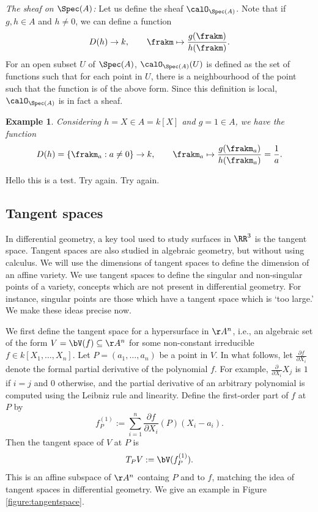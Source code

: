\documentclass[12pt]{amsart}
\theoremstyle{plain}
\newtheorem{example}[theorem]{Example}
\begin{document}
\emph{The sheaf on $\Spec(A)$:}
Let us define the sheaf $\calO_{\Spec(A)}$.
Note that if $g, h\in A$ and $h \ne 0$, we can define a function
$$D(h) \to k, \qquad \frakm \mapsto \frac{g(\frakm)}{h(\frakm)}.$$
For an open subset $U$ of $\Spec(A)$, $\calO_{\Spec(A)}(U)$ is defined as the set of functions such that for each point in $U$, there is a neighbourhood of the point such that the function is of the above form.
Since this definition is local, $\calO_{\Spec(A)}$ is in fact a sheaf.

\begin{example}
Considering $h = X \in A=k[X]$ and $g=1\in A$, we have the function 
$$D(h) =\{\frakm_a : a \ne 0\} \to k, \qquad \frakm_a \mapsto \frac{g(\frakm_a)}{h(\frakm_a)} = \frac{1}{a}.$$
\end{example}

Hello this is a test. Try again. Try again.

\subsection{Tangent spaces}
In differential geometry, a key tool used to study surfaces in $\RR^3$ is the tangent space.
Tangent spaces are also studied in algebraic geometry, but without using calculus.
We will use the dimensions of tangent spaces to define the dimension of an affine variety.
We use tangent spaces to define the singular and non-singular points of a variety, concepts which are not present in differential geometry.
For instance, singular points are those which have a tangent space which is `too large.'
We make these ideas precise now.

We first define the tangent space for a hypersurface in $\AA^n$, i.e., an algebraic set of the form $V=\bV(f)\subseteq \AA^n$ for some non-constant irreducible $f \in k[X_1,\ldots,X_n]$.
Let $P=(a_1,\ldots,a_n)$ be a point in $V$.
In what follows, let $\frac{\partial f}{\partial X_i}$ denote the formal partial derivative of the polynomial $f$.
For example, $\frac{\partial}{\partial X_i} X_j$ is $1$ if $i=j$ and $0$ otherwise, and the partial derivative of an arbitrary polynomial is computed using the Leibniz rule and linearity.
Define the first-order part of $f$ at $P$ by
\begin{equation}\label{equationtangent}
f_P^{(1)} := \sum_{i=1}^n \frac{\partial f}{\partial X_i} (P) (X_i-a_i).
\end{equation}
Then the tangent space of $V$ at $P$ is
$$T_PV := \bV(f_P^{(1)}).$$
This is an affine subspace of $\AA^n$ containg $P$ and to $f$, matching the idea of tangent spaces in differential geometry.
We give an example in Figure \ref{figure:tangentspace}.
\end{document}
